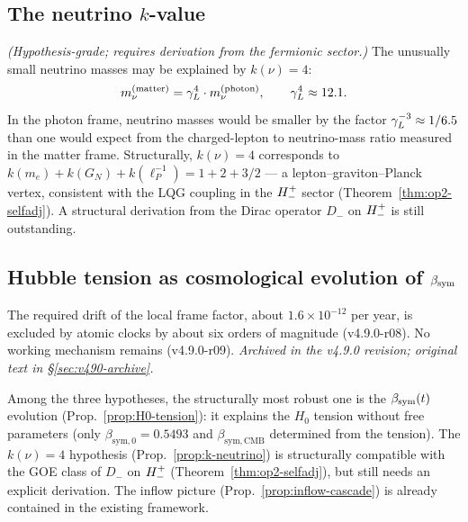\subsection[The neutrino k-value]{The neutrino \texorpdfstring{$k$}{k}-value}

\begin{proposition}[$k(\nu) = 4$ as hypothesis, hypothesis-grade]
\label{prop:k-neutrino}
\emph{(Hypothesis-grade; requires derivation from the fermionic sector.)}
The unusually small neutrino masses may be explained by $k(\nu) = 4$:
\[
 m_\nu^{(\mathrm{matter})} = \gamma_L^4 \cdot m_\nu^{(\mathrm{photon})},
 \qquad \gamma_L^4 \approx 12.1.
\]
In the photon frame, neutrino masses would be smaller by the factor
$\gamma_L^{-3} \approx 1/6.5$ than one would expect from the charged-lepton to
neutrino-mass ratio measured in the matter frame.
Structurally, $k(\nu) = 4$ corresponds to
$k(m_e)+k(G_N)+k(\ell_P^{-1}) = 1+2+3/2$ --- a lepton--graviton--Planck
vertex, consistent with the LQG coupling in the $H^+_-$ sector
(Theorem~\ref{thm:op2-selfadj}).
A structural derivation from the Dirac operator $D_-$ on $H^+_-$
is still outstanding.
\end{proposition}

\subsection{Hubble tension as cosmological evolution of $\beta_{\mathrm{sym}}$}

\begin{proposition}\label{prop:H0-tension}
The required drift of the local frame factor, about \(1.6\times10^{-12}\) per year, is excluded by atomic clocks by about six orders of magnitude (v4.9.0-r08).  No working mechanism remains (v4.9.0-r09).
\emph{Archived in the v4.9.0 revision; original text in \S\ref{sec:v490-archive}.}
\end{proposition}

\begin{remark}
\label{rem:inflow-evaluation}
Among the three hypotheses, the structurally most robust one is the
$\beta_{\mathrm{sym}}(t)$ evolution (Prop.~\ref{prop:H0-tension}): it explains the
$H_0$ tension without free parameters (only
$\beta_{\mathrm{sym},0} = 0.5493$ and
$\beta_{\mathrm{sym},\mathrm{CMB}}$ determined from the tension).
The $k(\nu) = 4$ hypothesis (Prop.~\ref{prop:k-neutrino}) is
structurally compatible with the GOE class of $D_-$ on $H^+_-$
(Theorem~\ref{thm:op2-selfadj}), but still needs an explicit derivation.
The inflow picture (Prop.~\ref{prop:inflow-cascade}) is already contained
in the existing framework.
\end{remark}


